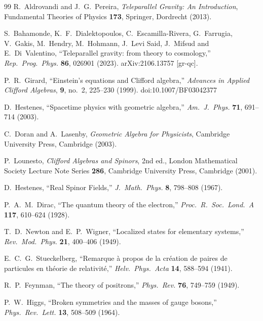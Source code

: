 \documentclass[a4paper]{article}
\begin{document}
\begin{thebibliography}{99}
R.~Aldrovandi and J.~G.~Pereira,
\textit{Teleparallel Gravity: An Introduction},
Fundamental Theories of Physics \textbf{173},
Springer, Dordrecht (2013).

S.~Bahamonde, K.~F.~Dialektopoulos, C.~Escamilla-Rivera, G.~Farrugia, V.~Gakis, M.~Hendry, M.~Hohmann, J.~Levi Said, J.~Mifsud and E.~Di~Valentino,
``Teleparallel gravity: from theory to cosmology,''
\textit{Rep.\ Prog.\ Phys.} \textbf{86}, 026901 (2023).
arXiv:2106.13757 [gr-qc].

P.~R.~Girard,
``Einstein's equations and Clifford algebra,''
\textit{Advances in Applied Clifford Algebras},
\textbf{9}, no.~2, 225--230 (1999).
doi:10.1007/BF03042377

D.~Hestenes,
``Spacetime physics with geometric algebra,''
\textit{Am.\ J.\ Phys.} \textbf{71}, 691--714 (2003).

C.~Doran and A.~Lasenby,
\textit{Geometric Algebra for Physicists},
Cambridge University Press, Cambridge (2003).

P.~Lounesto,
\textit{Clifford Algebras and Spinors}, 2nd ed.,
London Mathematical Society Lecture Note Series \textbf{286},
Cambridge University Press, Cambridge (2001).

D.~Hestenes,
``Real Spinor Fields,''
\textit{J.\ Math.\ Phys.} \textbf{8}, 798--808 (1967).

P.~A.~M.~Dirac,
``The quantum theory of the electron,''
\textit{Proc.\ R.\ Soc.\ Lond.\ A} \textbf{117}, 610--624 (1928).

T.~D.~Newton and E.~P.~Wigner,
``Localized states for elementary systems,''
\textit{Rev.\ Mod.\ Phys.} \textbf{21}, 400--406 (1949).

E.~C.~G.~Stueckelberg,
``Remarque \`a propos de la cr\'eation de paires de particules en th\'eorie de relativit\'e,''
\textit{Helv.\ Phys.\ Acta} \textbf{14}, 588--594 (1941).

R.~P.~Feynman,
``The theory of positrons,''
\textit{Phys.\ Rev.} \textbf{76}, 749--759 (1949).

P.~W.~Higgs,
``Broken symmetries and the masses of gauge bosons,''
\textit{Phys.\ Rev.\ Lett.} \textbf{13}, 508--509 (1964).


\end{thebibliography}
\end{document}
